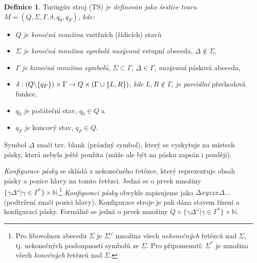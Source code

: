 \documentclass[a4paper,11pt,twocolumn]{article}
\theoremstyle{definition}
\newtheorem{definice}{Definice}[section]
\theoremstyle{definition}
\theoremstyle{definition}
\begin{document}
\begin{definice}
\label{definice1} Turingův stroj (TS) \emph{je definován jako šestice tvaru $M=(Q,\Sigma,\Gamma,\delta, q_{0}, q_{F})$, kde:}
\begin{itemize}

  \item $Q$ \emph{je konečná množina} vnitřních (řídicích) stavů

  \item $\Sigma$ \emph{je konečná množina symbolů nazývaná} vstupní abeceda, $\Delta \notin \Sigma$,

  \item $\Gamma$ \emph{je konečná množina symbolů,} $\Sigma \subset \Gamma$, $\Delta \in \Gamma$, \emph{nazývaná} pásková abeceda,

  \item $\delta : (Q \symbol{92} \{q_{F}\})\times\Gamma \rightarrow Q \times (\Gamma \cup \{ L,R \} )$, \emph{kde} $L,R \notin \Gamma$, \emph{je parciální} přechodová funkce,

  \item $q_{0}$ \emph{je} počáteční stav, $q_{0} \in Q$ a

  \item $q_{F}$ \emph{je} koncový stav, $q_{F} \in Q$.

\end{itemize}
\par
Symbol $\Delta$ značí tzv. blank (prázdný symbol), který se vyskytuje na místech pásky, která nebyla ještě použita (může ale být na pásku zapsán i později).\par
\emph{Konfigurace pásky} se skládá z nekonečného řetězce, který reprezentuje obsah pásky a pozice hlavy na tomto řetězci. Jedná se o prvek množiny $\{ \gamma \Delta^{\omega} | \gamma \in \Gamma^{*} \} \times \mathbb{N}$.\footnote{Pro libovolnou abecedu $\Sigma$ je $\Sigma^{\omega}$ množina všech \emph{nekonečných} řetězců nad $\Sigma$, tj. nekonečných posloupností symbolů ze $\Sigma$. Pro připomenutí: $\Sigma^{*}$ je množina všech \emph{konečných} řetězců nad $\Sigma$.}
\emph{Konfiguraci pásky} obvykle zapisujeme jako $\Delta xyz\underline{z}x\Delta ... $ (podtržení značí pozici hlavy). Konfigurace stroje je pak dána stavem řízení a konfigurací pásky. Formálně se jedná o prvek množiny $Q  \times \{ \gamma \Delta^{\omega} | \gamma \in \Gamma^{*} \} \times \mathbb{N} $.

\end{definice}
\end{document}
